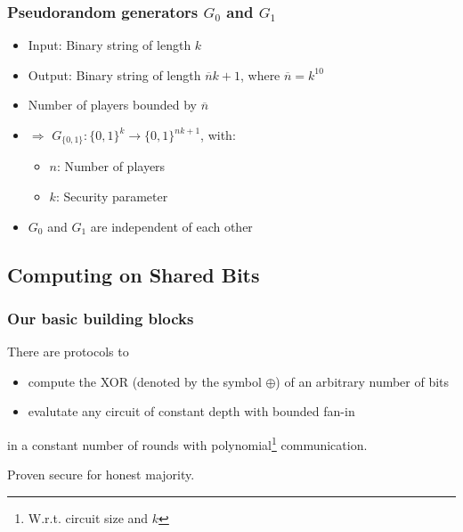 \documentclass{beamer}
\begin{document}
\begin{frame}
  \frametitle{Pseudorandom generators $G_0$ and $G_1$}
  \begin{itemize}
  \item Input: Binary string of length $k$
  \item Output: Binary string of length $\overline{n}k+1$, where $\overline{n}=k^{10}$
  \item Number of players bounded by $\overline{n}$
  \item $\Rightarrow$ \alert<2>{$G_{\{0,1\}}: \{0,1\}^k\rightarrow \{0,1 \}^{nk+1}$}, with:
    \begin{itemize}
    \item $n$: Number of players
    \item $k$: Security parameter
    \end{itemize}
  \item $G_0$ and $G_1$ are independent of each other
  \end{itemize}
\end{frame}

\subsection{Computing on Shared Bits}
\label{sec:computing-on-shared-bits}

\begin{frame}
  \frametitle{Our basic building blocks}
  There are protocols to
  \begin{itemize}    
  \item<alert@2> compute the XOR (denoted by the symbol $\oplus$) of an arbitrary number of bits
  \item<alert@2> evalutate any circuit of constant depth with bounded fan-in
  \end{itemize}
  in a constant number of rounds with polynomial\footnote{W.r.t. circuit size and $k$} communication.
  
  Proven secure for honest majority.
\end{frame}
\end{document}
